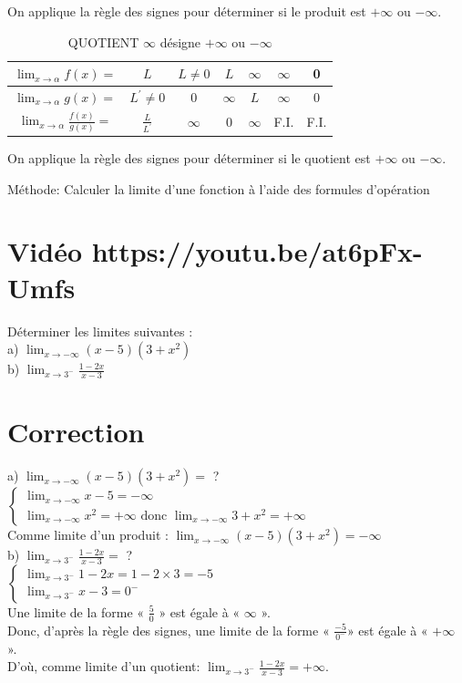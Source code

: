 \documentclass[10pt]{article}
\begin{document}
On applique la règle des signes pour déterminer si le produit est $+\infty$ ou $-\infty$.

\begin{table}[h]
\begin{center}
\captionsetup{labelformat=empty}
\caption{QUOTIENT $\infty$ désigne $+\infty$ ou $-\infty$}
\begin{tabular}{|c|c|c|c|c|c|c|}
\hline
$\lim _{x \rightarrow \alpha} f(x)=$ & $L$ & $L \neq 0$ & $L$ & $\infty$ & $\infty$ & 0 \\
\hline
$\lim _{x \rightarrow \alpha} g(x)=$ & $L^{\prime} \neq 0$ & 0 & $\infty$ & $L$ & $\infty$ & 0 \\
\hline
$\lim _{x \rightarrow \alpha} \frac{f(x)}{g(x)}=$ & $\frac{L}{L^{\prime}}$ & $\infty$ & 0 & $\infty$ & F.I. & F.I. \\
\hline
\end{tabular}
\end{center}
\end{table}

On applique la règle des signes pour déterminer si le quotient est $+\infty$ ou $-\infty$.

Méthode: Calculer la limite d'une fonction à l'aide des formules d'opération

\section*{Vidéo https://youtu.be/at6pFx-Umfs}
Déterminer les limites suivantes :\\
a) $\lim _{x \rightarrow-\infty}(x-5)\left(3+x^{2}\right)$\\
b) $\lim _{x \rightarrow 3^{-}} \frac{1-2 x}{x-3}$

\section*{Correction}
a) $\lim _{x \rightarrow-\infty}(x-5)\left(3+x^{2}\right)=$ ?\\
$\left\{\begin{array}{l}\lim _{x \rightarrow-\infty} x-5=-\infty \\ \lim _{x \rightarrow-\infty} x^{2}=+\infty \text { donc } \lim _{x \rightarrow-\infty} 3+x^{2}=+\infty\end{array}\right.$\\
Comme limite d'un produit : $\lim _{x \rightarrow-\infty}(x-5)\left(3+x^{2}\right)=-\infty$\\
b) $\lim _{x \rightarrow 3^{-}} \frac{1-2 x}{x-3}=$ ?\\
$\left\{\begin{array}{l}\lim _{x \rightarrow 3^{-}} 1-2 x=1-2 \times 3=-5 \\ \lim _{x \rightarrow 3^{-}} x-3=0^{-}\end{array}\right.$\\
Une limite de la forme « $\frac{5}{0}$ » est égale à « $\infty$ ».\\
Donc, d'après la règle des signes, une limite de la forme « $\frac{-5}{0^{-}}$» est égale à « $+\infty$ ».\\
D'où, comme limite d'un quotient: $\lim _{x \rightarrow 3^{-}} \frac{1-2 x}{x-3}=+\infty$.
\end{document}
